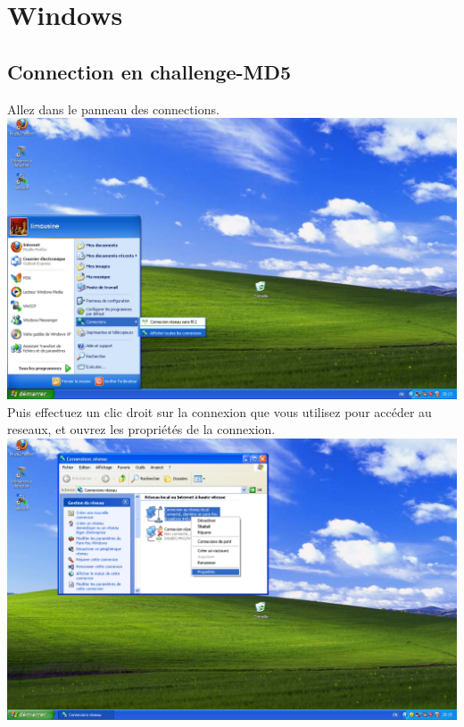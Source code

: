 \newcommand{\screenShotSize}{400pt}


\section{Windows}


\subsection{Connection en challenge-MD5}

Allez dans le panneau des connections.\\
\includegraphics[width=\screenShotSize{}]{img/connections.PNG}\\
Puis effectuez un clic droit sur la connexion que vous utilisez pour accéder au reseaux, et ouvrez les propriétés de la connexion.\\
\includegraphics[width=\screenShotSize{}]{img/connectionProperties.PNG}\\

